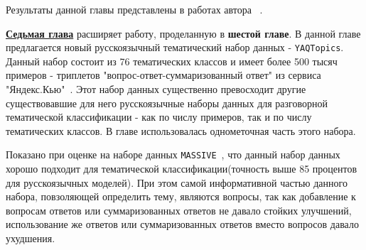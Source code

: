 Результаты данной главы представлены в работах автора ~\cite{rumtl,enmtl}.

\underline{\textbf{Седьмая глава}} расширяет работу, проделанную в \textbf{шестой главе}. В данной главе предлагается новый русскоязычный тематический набор данных - \texttt{YAQTopics}.  Данный набор состоит из 76 тематических классов и имеет более 500 тысяч примеров - триплетов "вопрос-ответ-суммаризованный ответ" из сервиса "Яндекс.Кью"~\cite{yandex_q}. Этот набор данных существенно превосходит другие существовавшие для него русскоязычные наборы данных для разговорной тематической классификации - как по числу примеров, так и по числу тематических классов. В главе использовалась однометочная часть этого набора. 

\begin{table}[t]
\centering
{}
\caption{Размеры набора данных \texttt{YAQTopics} по классу и разбиению}
\label{tab:rutopics:sizes2}
\end{table}


Показано при оценке на наборе данных \texttt{MASSIVE}~\cite{massive}, что данный набор данных хорошо подходит для тематической классификации(точность выше 85 процентов для русскоязычных моделей). При этом самой информативной частью данного набора, повзоляющей определить тему, являются вопросы, так как добавление к вопросам ответов или суммаризованных ответов не давало стойких улучшений, использование же ответов или суммаризованных ответов вместо вопросов давало ухудшения.



